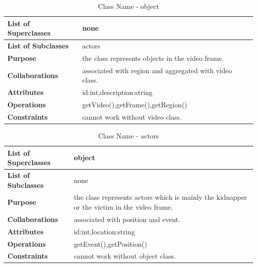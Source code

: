 \documentclass[12pt]{article}
\begin{document}
\begin{table}[h!]
\caption{Class Name - object}
\label{tab:my-table}
\begin{tabular}{|p{}|p{}|}


 \hline
\textbf{List of Superclasses}  & none                                                     
\\ \hline
\textbf{List of Subclasses}    & actors                                                                   
\\ \hline
\textbf{Purpose}               & the class represents objects in the video frame.                                                               
\\ \hline
\textbf{Collaborations}        & associated with region and aggregated with video class. 
\\ \hline
\textbf{Attributes}  & id:int,description:string
\\ \hline
\textbf{Operations} & getVideo(),getFrame(),getRegion()
\\ \hline
\textbf{Constraints} & cannot work without video class.
\\ \hline
\end{tabular}
\end{table}


\begin{table}[h!]
\caption{Class Name - actors}
\label{tab:my-table}
\begin{tabular}{|p{}|p{}|}


 \hline
\textbf{List of Superclasses}  & object                                                    
\\ \hline
\textbf{List of Subclasses}    & none                                                                
\\ \hline
\textbf{Purpose}               & the class represents actors which is mainly the kidnapper or the victim in the video frame.                                                               
\\ \hline
\textbf{Collaborations}        & associated with position and event. 
\\ \hline
\textbf{Attributes}  & id:int,location:string
\\ \hline
\textbf{Operations} & getEvent(),getPosition()
\\ \hline
\textbf{Constraints} & cannot work without object class.
\\ \hline
\end{tabular}
\end{table}
\end{document}
